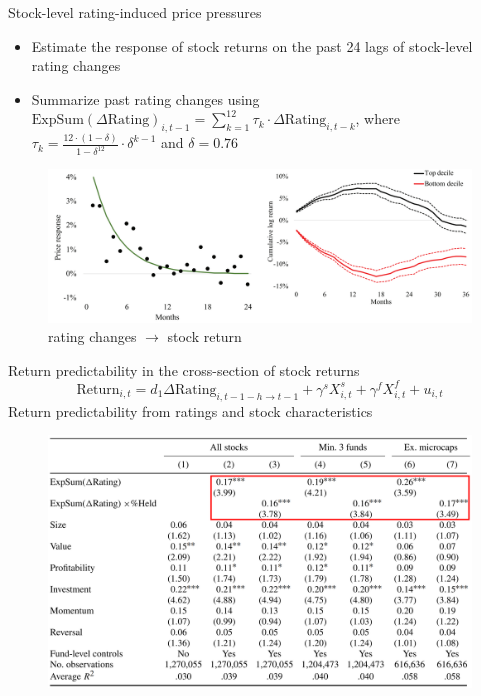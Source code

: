 \documentclass[UTF8, 16pt]{beamer}
\begin{document}
\begin{CJK*}{UTF8}{gbsn}
\begin{frame}{Stock-level rating-induced price pressures}
	\begin{itemize}
		\item Estimate the response of stock returns on the past 24 lags of stock-level rating changes
		\item Summarize past rating changes using $\mathrm{ExpSum}(\Delta\mathrm{Rating})_{i, t-1}=\sum_{k=1}^{12} \tau_{k} \cdot \Delta \mathrm{Rating}_{i, t-k}$, where $\tau_{k}=\frac{12 \cdot(1-\delta)}{1-\delta^{12}} \cdot \delta^{k-1}$ and $\delta=0.76$
	\end{itemize}
	\begin{figure}[htpb]
	  \begin{center}
	    \includegraphics[width=0.89  \linewidth]
	    {pic/rating_changes_return.png}
	  \end{center}
	  \caption{rating changes $\rightarrow$ stock return}
	\end{figure}
\end{frame}

\begin{frame}{Return predictability in the cross-section of stock returns}
	\vspace{-0.6cm}
	$$\mathrm{Return}_{i, t}=d_{1} \Delta \mathrm{Rating}_{i, t-1-h \rightarrow t-1}+\gamma^{s} X_{i, t}^{s}+\gamma^{f} X_{i, t}^{f}+u_{i, t}$$
	\center \tiny{Return predictability from ratings and stock characteristics}
	\vspace{-0.3cm}
	\begin{figure}[htpb]
	  \begin{center}
	    \includegraphics[width=0.89  \linewidth]
	    {pic/return_predictability.png}
	  \end{center}
	\end{figure}
\end{frame}


\end{CJK*}
\end{document}
